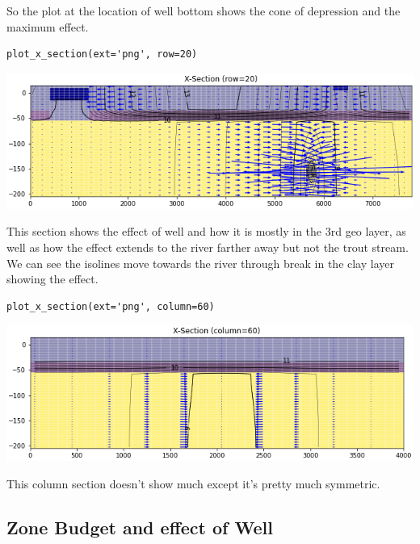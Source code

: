 \documentclass[titlepage,12pt]{unisubmission}
\begin{document}
So the plot at the location of well bottom shows the cone of depression and the maximum effect.

\begin{verbatim}
plot_x_section(ext='png', row=20)
\end{verbatim}

\begin{center}
\begin{center}
\includegraphics[width=.9\linewidth]{./images/3_section_row-20.png}
\end{center}
\end{center}

This section shows the effect of well and how it is mostly in the 3rd geo layer, as well as how the effect extends to the river farther away but not the trout stream. We can see the isolines move towards the river through break in the clay layer showing the effect.

\begin{verbatim}
plot_x_section(ext='png', column=60)
\end{verbatim}

\begin{center}
\begin{center}
\includegraphics[width=.9\linewidth]{./images/3_section_column-60.png}
\end{center}
\end{center}

This column section doesn't show much except it's pretty much symmetric.

\subsection{Zone Budget and effect of Well}
\label{sec:org16d37f6}
\end{document}
